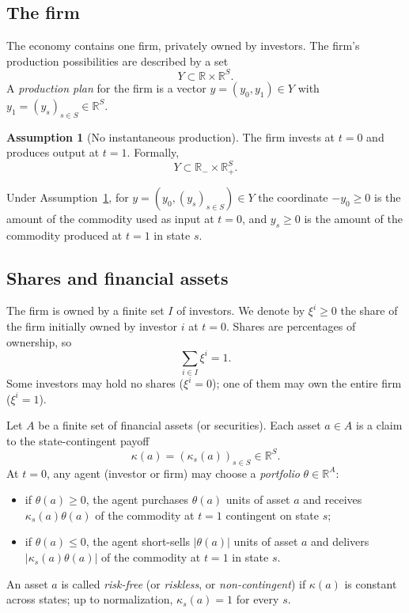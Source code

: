 \documentclass[11pt,a4paper,oneside]{book}
\def\R{\mathbb{R}}
\def\leq{\leqslant}
\def\geq{\geqslant}
\theoremstyle{plain}
\theoremstyle{definition}
\newtheorem{assumption}[theorem]{Assumption}
\theoremstyle{remark}
\numberwithin{equation}{chapter}
\begin{document}
\subsection{The firm}

The economy contains one firm, privately owned by investors.
The firm's production possibilities are described by a set
\begin{equation*}
  Y \subset \R \times \R^{S}.
\end{equation*}
A \emph{production plan} for the firm is a vector $y = (y_0, y_1) \in Y$ with $y_1 = (y_s)_{s \in S} \in \R^S$.

\begin{assumption}[No instantaneous production]\label{ass:no-instant}
The firm invests at $t=0$ and produces output at $t=1$.
Formally,
\begin{equation*}
  Y \subset \R_{-} \times \R^{S}_{+}.
\end{equation*}
\end{assumption}

Under Assumption~\ref{ass:no-instant}, for $y = (y_0, (y_s)_{s \in S}) \in Y$ the coordinate $-y_0 \geq 0$ is the amount of the commodity used as input at $t=0$, and $y_s \geq 0$ is the amount of the commodity produced at $t=1$ in state $s$.

\subsection{Shares and financial assets}

The firm is owned by a finite set $I$ of investors.
We denote by $\xi^i \geq 0$ the share of the firm initially owned by investor $i$ at $t=0$.
Shares are percentages of ownership, so
\begin{equation*}
  \sum_{i \in I} \xi^i = 1.
\end{equation*}
Some investors may hold no shares ($\xi^i = 0$); one of them may own the entire firm ($\xi^i = 1$).

Let $A$ be a finite set of financial assets (or securities).
Each asset $a \in A$ is a claim to the state-contingent payoff
\begin{equation*}
  \kappa(a) = (\kappa_s(a))_{s \in S} \in \R^S.
\end{equation*}
At $t=0$, any agent (investor or firm) may choose a \emph{portfolio} $\theta \in \R^A$:
\begin{itemize}
  \item if $\theta(a) \geq 0$, the agent purchases $\theta(a)$ units of asset $a$ and receives $\kappa_s(a) \theta(a)$ of the commodity at $t=1$ contingent on state $s$;
  \item if $\theta(a) \leq 0$, the agent short-sells $|\theta(a)|$ units of asset $a$ and delivers $|\kappa_s(a) \theta(a)|$ of the commodity at $t=1$ in state $s$.
\end{itemize}
An asset $a$ is called \emph{risk-free} (or \emph{riskless}, or \emph{non-contingent}) if $\kappa(a)$ is constant across states; up to normalization, $\kappa_s(a) = 1$ for every $s$.
\end{document}
